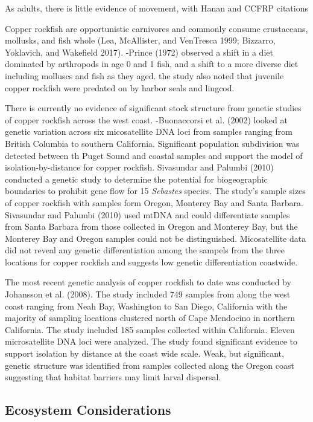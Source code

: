 \documentclass[11pt,
  english,
  letterpaper,
]{article}
\begin{document}
As adults, there is little evidence of movement, with Hanan and CCFRP citations

Copper rockfish are opportunistic carnivores and commonly consume crustaceans, mollusks, and fish whole (Lea, McAllister, and VenTresca 1999; Bizzarro, Yoklavich, and Wakefield 2017). -Prince (1972) observed a shift in a diet dominated by arthropods in age 0 and 1 fish, and a shift to a more diverse diet including molluscs and fish as they aged. the study also noted that juvenile copper rockfish were predated on by harbor seals and lingcod.

There is currently no evidence of significant stock structure from genetic studies of copper rockfish across the west coast. -Buonaccorsi et al. (2002) looked at genetic variation across six micosatellite DNA loci from samples ranging from British Columbia to southern California. Significant population subdivision was detected between th Puget Sound and coastal samples and support the model of isolation-by-distance for copper rockfish. Sivasundar and Palumbi (2010) conducted a genetic study to determine the potential for biogeographic boundaries to prohibit gene flow for 15 \emph{Sebastes} species. The study's sample sizes of copper rockfish with samples form Oregon, Monterey Bay and Santa Barbara. Sivasundar and Palumbi (2010) used mtDNA and could differentiate samples from Santa Barbara from those collected in Oregon and Monterey Bay, but the Monterey Bay and Oregon samples could not be distinguished. Micosatellite data did not reveal any genetic differentiation among the sampels from the three locations for copper rockfish and suggests low genetic differentiation coastwide.

The most recent genetic analysis of copper rockfish to date was conducted by Johansson et al. (2008). The study included 749 samples from along the west coast ranging from Neah Bay, Washington to San Diego, California with the majority of sampling locations clustered north of Cape Mendocino in northern California. The study included 185 samples collected within California. Eleven microsatellite DNA loci were analyzed. The study found significant evidence to support isolation by distance at the coast wide scale. Weak, but significant, genetic structure was identified from samples collected along the Oregon coast suggesting that habitat barriers may limit larval dispersal.

\hypertarget{ecosystem-considerations-1}{%
\subsection{Ecosystem Considerations}\label{ecosystem-considerations-1}}
\end{document}
